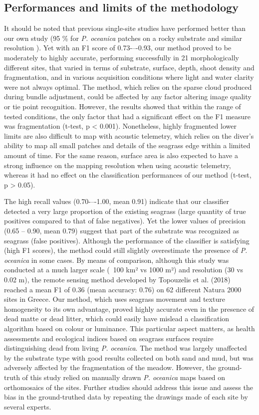 \subsection{Performances and limits of the methodology}
It should be noted that previous single-site studies have performed better than our own study (95 \% for \textit{P. oceanica} patches on a rocky substrate and similar resolution \citep{bonin-font_towards_2016}). Yet with an F1 score of 0.73-–-0.93, our method proved to be moderately to highly accurate, performing successfully in 21 morphologically different sites, that varied in terms of substrate, surface, depth, shoot density and fragmentation, and in various acquisition conditions where light and water clarity were not always optimal. The method, which relies on the sparse cloud produced during bundle adjustment, could be affected by any factor altering image quality or tie point recognition. However, the results showed that within the range of tested conditions, the only factor that had a significant effect on the F1 measure was fragmentation (t-test, p < 0.001). Nonetheless, highly fragmented lower limits are also difficult to map with acoustic telemetry, which relies on the diver's ability to map all small patches and details of the seagrass edge within a limited amount of time. For the same reason, surface area is also expected to have a strong influence on the mapping resolution when using acoustic telemetry, whereas it had no effect on the classification performances of our method (t-test, p > 0.05).

The high recall values (0.70-–-1.00, mean 0.91) indicate that our classifier detected a very large proportion of the existing seagrass (large quantity of true positives compared to that of false negatives). Yet the lower values of precision (0.65 – 0.90, mean 0.79) suggest that part of the substrate was recognized as seagrass (false positives). Although the performance of the classifier is satisfying (high F1 scores), the method could still slightly overestimate the presence of \textit{P. oceanica} in some cases. By means of comparison, although this study was conducted at a much larger scale (~100 km² vs 1000 m²) and resolution (30 vs 0.02 m), the remote sensing method developed by Topouzelis et al. (2018) reached a mean F1 of 0.36 (mean accuracy: 0.76) on 62 different Natura 2000 sites in Greece. Our method, which uses seagrass movement and texture homogeneity to its own advantage, proved highly accurate even in the presence of dead matte or dead litter, which could easily have mislead a classification algorithm based on colour or luminance. This particular aspect matters, as health assessments and ecological indices based on seagrass surfaces require distinguishing dead from living \textit{P. oceanica}. The method was largely unaffected by the substrate type with good results collected on both sand and mud, but was adversely affected by the fragmentation of the meadow. However, the ground-truth of this study relied on manually drawn \textit{P. oceanica} maps based on orthomosaics of the sites. Further studies should address this issue and assess the bias in the ground-truthed data by repeating the drawings made of each site by several experts. 

